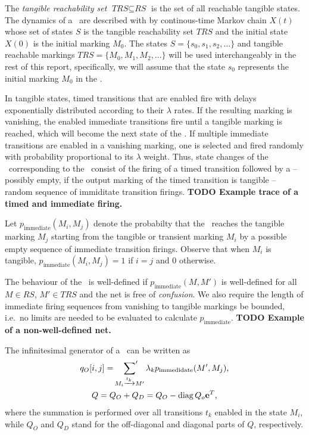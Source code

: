 \documentclass[a4paper,11pt,twoside,openright]{memoir}
\renewcommand*{\vec}[1]{\boldsymbol{\mathrm{#1}}}
\newcommand*{\RS}{\textit{RS}}
\newcommand*{\TRS}{\textit{TRS}}
\DeclareMathOperator{\diag}{diag}
\newcommand*{\textabbrev}[1]{\textls[50]{\textsc{#1}}}
\newcommand*{\ctmc}{\textabbrev{ctmc}}
\newcommand*{\gspn}{\textabbrev{gspn}}
\theoremstyle{my}
\begin{document}
The \emph{tangible reachability set} $\TRS \subseteq \RS$ is the set
of all reachable tangible states. The dynamics of a \gspn\ are
described with by continous-time Markov chain $X(t)$ whose set of
states $S$ is the tangible reachability set $\TRS$ and the initial
state $X(0)$ is the initial marking $M_0$. The states
$S = \{s_0, s_1, s_2, \ldots\}$ and tangible reachable markings
$\TRS = \{M_0, M_1, M_2, \ldots\}$ will be used interchangeably in the
rest of this report, specifically, we will assume that the state $s_0$
represents the initial marking $M_0$ in the \ctmc.

In tangible states, timed transitions that are enabled fire with
delays exponentially distributed according to their $\lambda$
rates. If the resulting marking is vanishing, the enabled immediate
transitions fire until a tangible marking is reached, which will
become the next state of the \ctmc. If multiple immediate transitions
are enabled in a vanishing marking, one is selected and fired randomly
with probability proportional to its $\lambda$ weight. Thus, state
changes of the \ctmc\ corresponding to the \gspn\ consist of the
firing of a timed transition followed by a -- possibly empty, if the
output marking of the timed transition is tangible -- random sequence
of immiditate transition firings. \textbf{TODO Example trace of a
  timed and immediate firing.}

Let $p_{\text{immediate}}(M_i, M_j)$ denote the probabilty that the
\gspn\ reaches the tangible marking $M_j$ starting from the tangible
or transient marking $M_i$ by a possible empty sequence of immediate
transition firings. Observe that when $M_i$ is tangible,
$p_{\text{immediate}}(M_i, M_j) = 1$ if $i = j$ and $0$ otherwise.

The behaviour of the \gspn\ is well-defined if
$p_{\text{immediate}}(M, M')$ is well-defined for all $M \in \RS$,
$M' \in \TRS$ \citep{DBLP:journals/tse/TeruelFP03} and the net is free
of \emph{confusion}. We also require the length of immediate firing
sequences from vanishing to tangible markings be bounded, i.e.~no
limits are needed to be evaluated to calculate
$p_{\text{immediate}}$. \textbf{TODO Example of a non-well-defined
  net.}

The infinitesimal generator of a \gspn\ can be written as
\begin{gather}
  q_{O}[i, j] = \sideset{}{'}\sum_{M_i \xrightarrow{t_k} M'} \lambda_k
  p_{\text{immedidate}}(M', M_j)
  \text, \\
  Q = Q_{O} + Q_{D} = Q_{O} - \diag Q_o \vec{e}^T \text,
\end{gather}
where the summation is performed over all transitions $t_k$ enabled in
the state $M_i$, while $Q_O$ and $Q_D$ stand for the off-diagonal and
diagonal parts of $Q$, respectively.
\end{document}
